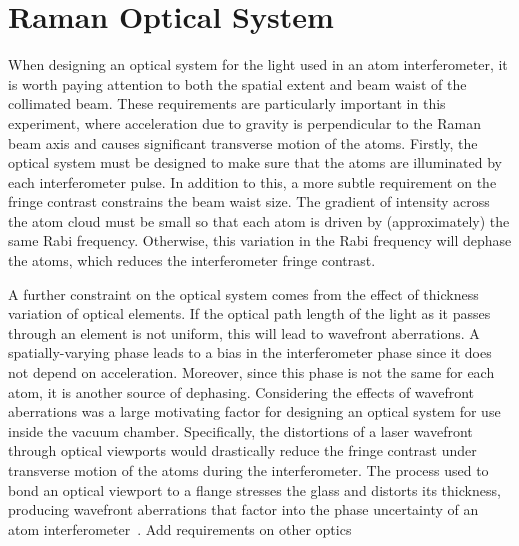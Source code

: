 \section{Raman Optical System}\label{sec:setup_ramanoptics}
When designing an optical system for the light used in an atom interferometer,
it is worth paying attention to both the spatial extent and beam waist of the
collimated beam. These requirements are particularly important in this
experiment, where acceleration due to gravity is perpendicular to the Raman beam
axis and causes significant transverse motion of the atoms. Firstly, the optical
system must be designed to make sure that the atoms are illuminated by each
interferometer pulse. In addition to this, a more subtle requirement on the
fringe contrast constrains the beam waist size. The gradient of intensity across
the atom cloud must be small so that each atom is driven by (approximately) the
same Rabi frequency. Otherwise, this variation in the Rabi frequency will
dephase the atoms, which reduces the interferometer fringe contrast.
\par\noindent A further constraint on the optical system comes from the effect
of thickness variation of optical elements. If the optical path length of the
light as it passes through an element is not uniform, this will lead to
wavefront aberrations. A spatially-varying phase leads to a bias in the
interferometer phase since it does not depend on acceleration. Moreover, since
this phase is not the same for each atom, it is another source of dephasing.
Considering the effects of wavefront aberrations was a large motivating factor
for designing an optical system for use inside the vacuum chamber. Specifically,
the distortions of a laser wavefront through optical viewports would drastically
reduce the fringe contrast under transverse motion of the atoms during the
interferometer. The process used to bond an optical viewport to a flange
stresses the glass and distorts its thickness, producing wavefront aberrations
that factor into the phase uncertainty of an atom
interferometer~\cite{Schkolnik2015}. {\huge Add requirements on other optics}
